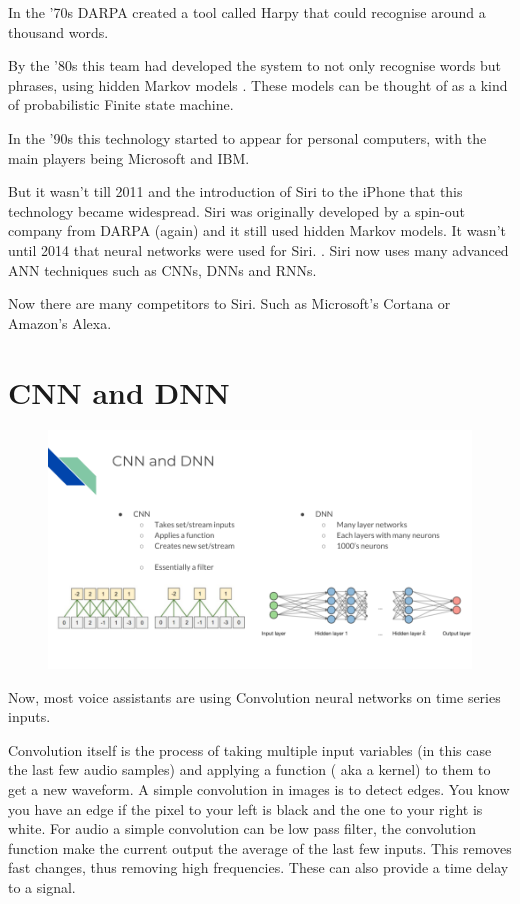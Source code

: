 \documentclass[10pt]{article}
\begin{document}
        In the ’70s DARPA created a tool called Harpy that could recognise around a thousand words. \cite{1976PhDT........81L}
        
         By the ’80s this team had developed the system to not only recognise words but phrases, using hidden Markov models \cite{rabiner1986introduction}. These models can be thought of as a kind of probabilistic Finite state machine.

        In the ’90s this technology started to appear for personal computers, with the main players being Microsoft and IBM.

        But it wasn't till 2011 and the introduction of Siri\cite{siri} to the iPhone that this technology became widespread. Siri was originally developed by a spin-out company from DARPA (again) and it still used hidden Markov models. It wasn't until 2014 that neural networks were used for Siri. \cite{wired}. Siri now uses many advanced ANN techniques such as CNNs, DNNs and RNNs.
        
        Now there are many competitors to Siri. Such as Microsoft's Cortana or Amazon's Alexa.
        \newpage

    \section*{CNN and DNN}
	    
	    \begin{figure}[H]
            \centering
            \includegraphics[width=1\textwidth]{slide_3}
            \label{fig:appendix:slide_3}
        \end{figure}
         Now, most voice assistants are using Convolution neural networks on time series inputs.\cite{LeCun1998-nt}
        
        Convolution itself is the process of taking multiple input variables (in this case the last few audio samples) and applying a function ( aka a kernel)  to them to get a new waveform.  A simple convolution in images is to detect edges. You know you have an edge if the pixel to your left is black and the one to your right is white. For audio a simple convolution can be low pass filter, the convolution function make the current output the average of the last few inputs. This removes fast changes, thus removing high frequencies.
        These can also provide a time delay to a signal.
        
\end{document}
